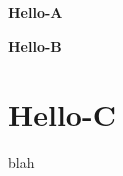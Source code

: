 \documentclass{article}
\begin{document}
\textbf{Hello-A}
\begin{center}
\textbf{Hello-B}
\end{center}
\section{\textbf{Hello-C}}
blah
\end{document}
